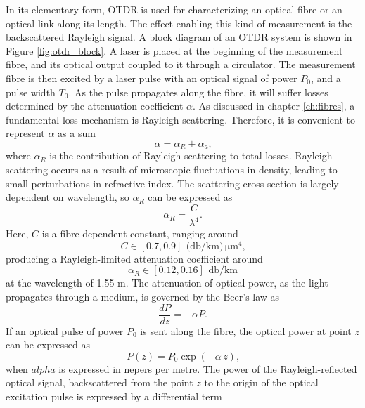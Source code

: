 \documentclass{standalone}
\begin{document}
In its elementary form, OTDR is used for characterizing an optical fibre or an optical link along its length. The effect enabling this kind of measurement is the backscattered Rayleigh signal. A block diagram of an OTDR system is shown in Figure \ref{fig:otdr_block}.
A laser is placed at the beginning of the measurement fibre, and its optical output coupled to it through a circulator. The measurement fibre is then excited by a laser pulse with an optical signal of power $P_0$, and a pulse width $T_0$. As the pulse propagates along the fibre, it will suffer losses determined by the attenuation coefficient $\alpha$. As discussed in chapter \ref{ch:fibres}, a fundamental loss mechanism is Rayleigh scattering. Therefore, it is convenient to represent $\alpha$ as a sum
\begin{equation}
\alpha = \alpha_R + \alpha_a \textrm{,}
\end{equation}
where $\alpha_R$ is the contribution of Rayleigh scattering to total losses. Rayleigh scattering occurs as a result of microscopic fluctuations in density, leading to small perturbations in refractive index. The scattering cross-section is largely dependent on wavelength, so $\alpha_R$ can be expressed as
\begin{equation}
\alpha_R = \frac{C}{\lambda^4} \textrm{.}
\end{equation}
Here, $C$ is a fibre-dependent constant, ranging around
\begin{equation}
C \in \left[ 0.7, 0.9 \right]\, \SI{}{(\decibel / \kilo \meter) \, \micro \meter ^4} \textrm{,}
\end{equation}
producing a Rayleigh-limited attenuation coefficient around 
\begin{equation}
\alpha_R \in \left[0.12, 0.16\right] \, \SI{}{\decibel / \kilo \meter}
\end{equation}
at the wavelength of 1.55 \textmu m. The attenuation of optical power, as the light propagates through a medium, is governed by the Beer's law as
\begin{equation}
\frac{dP}{dz} = -\alpha P \textrm{.}
\end{equation}
If an optical pulse of power $P_0$ is sent along the fibre, the optical power at point $z$ can be expressed as
\begin{equation}
P(z) = P_0 \exp\left(-\alpha \, z\right) \textrm{,}
\end{equation}
when $alpha$ is expressed in nepers per metre. The power of the Rayleigh-reflected optical signal, backscattered from the point $z$ to the origin of the optical excitation pulse is expressed by a differential term
\end{document}
